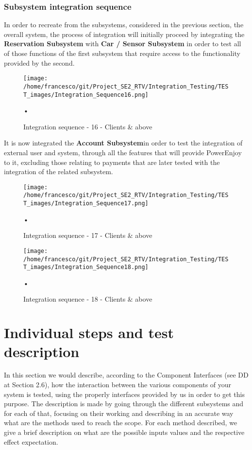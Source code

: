 \documentclass[10pt, a4paper,titlepage]{article}
\begin{document}
\subsubsection{Subsystem integration sequence}
In order to recreate from the subsystems, considered in the previous section, the overall system, the process of integration will initially proceed by integrating the \textbf{Reservation Subsystem} with \textbf{Car / Sensor Subsystem} in order to test all of those functions of the first subsystem that require access to the functionality provided by the second.
\begin{figure}[h]
\begin{center}
\texttt{[image: /home/francesco/git/Project\_SE2\_RTV/Integration\_Testing/TEST\_images/Integration\_Sequence16.png]}
\caption{Integration sequence - 16 - Clients \& above}
\label{fig:int_seq16}
\end{center}•
\end{figure}
\linebreak
It is now integrated  the \textbf{Account Subsystem}in order to test the integration of external user and system, through all the features that will provide PowerEnjoy to it, excluding those relating to payments that are later tested with the integration of the related subsystem.
\begin{figure}[h]
\begin{center}
\texttt{[image: /home/francesco/git/Project\_SE2\_RTV/Integration\_Testing/TEST\_images/Integration\_Sequence17.png]}
\caption{Integration sequence - 17 - Clients \& above}
\label{fig:int_seq17}
\end{center}•
\end{figure}
\begin{figure}[h]
\begin{center}
\texttt{[image: /home/francesco/git/Project\_SE2\_RTV/Integration\_Testing/TEST\_images/Integration\_Sequence18.png]}
\caption{Integration sequence - 18 - Clients \& above}
\label{fig:int_seq18}
\end{center}•
\end{figure}
\clearpage
\section{Individual steps and test description} \label{sec3}
In this section we would describe, according to the Component Interfaces (see DD at Section 2.6), how the interaction between the various components of your system is tested, using the properly interfaces provided by us in order to get this purpose. The description is made by going through the different subsystems and for each of that, focusing on their working and describing in an accurate way what are the methods used to reach the scope. For each method described, we give a brief description on what are the possible inputs values and the respective effect expectation.
\end{document}
